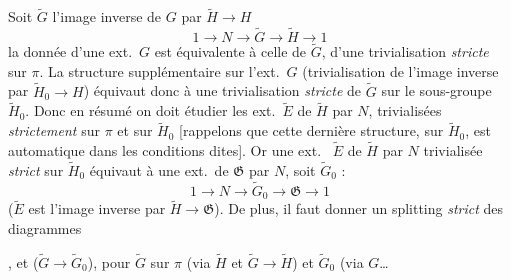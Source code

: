 \documentclass[11pt,a4paper]{article}
\begin{document}
Soit $\widetilde{G}$ l'image inverse de $G$ par $\widetilde{H} \to H$
\[
  1 \to N \to \widetilde{G} \to \widetilde{H} \to 1
\]
la donnée d'une ext.\ $G$ est équivalente à celle de $\widetilde{G}$,
 d'une trivialisation \emph{stricte} sur $\pi$. La 
structure supplémentaire sur l'ext.\ $G$ (trivialisation de
l'image inverse par $\widetilde{H}_0 \to H$) équivaut donc à une
trivialisation \emph{stricte} de $\widetilde{G}$ sur le
sous-groupe $\widetilde{H}_0$. Donc en résumé on doit étudier les
ext.\ $\widetilde{E}$ de $\widetilde{H}$ par $N$, trivialisées
\emph{strictement}  sur $\pi$ et sur
$\widetilde{H}_0$ [rappelons que cette dernière structure, \struck{\ill{}}
sur $\widetilde{H}_0$, est automatique dans les conditions dites]. Or une
ext.\ \struck{\ill{}} $\widetilde{E}$ de $\widetilde{H}$ par $N$
trivialisée \emph{strict} sur $\widetilde{H}_0$
équivaut à une ext.\ de $\mathfrak{G}$ par $N$, soit $\widetilde{G}_0$ :
\[
  1 \to N \to \widetilde{G}_0 \to \mathfrak{G} \to 1
\]
($\widetilde{E}$ est l'image inverse par $\widetilde{H} \to \mathfrak{G}$).
De plus, il faut donner un splitting \emph{strict} des diagrammes




 , et 
($\widetilde{G} \to \widetilde{G}_0$), pour $\widetilde{G}$ \ill{} sur
$\pi$ (via $\widetilde{H}$ et $\widetilde{G} \to \widetilde{H}$) et
\struck{\ill{}} $\widetilde{G}_0$ (via $G$…
\end{document}

